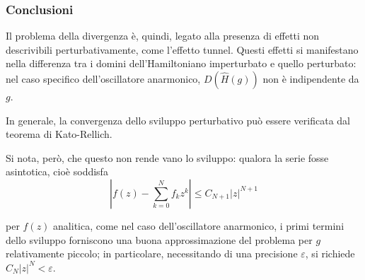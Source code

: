 \documentclass[10pt]{beamer}
\begin{document}
   \begin{frame}
	   \frametitle{Conclusioni}
	   Il problema della divergenza \`e, quindi, legato alla presenza di effetti non descrivibili perturbativamente, come l'effetto tunnel.
	   Questi effetti si manifestano nella differenza tra i domini dell'Hamiltoniano imperturbato e quello perturbato: nel caso specifico dell'oscillatore anarmonico, $D(\hat{H}(g))$ non \`e indipendente da $g$. 
	   
	   In generale, la convergenza dello sviluppo perturbativo pu\`o essere verificata dal teorema di Kato-Rellich.

	   \vspace{.25cm}
	   Si nota, per\`o, che questo non rende vano lo sviluppo: qualora la serie fosse asintotica, cio\`e soddisfa
\[
\left\lvert f(z) - \sum_{k=0}^{N} f_k z^k \right\rvert \le  C_{N+1} \lvert z \rvert ^{N+1} 
\] 

	   per $f(z)$ analitica, come nel caso dell'oscillatore anarmonico, i primi termini dello sviluppo forniscono una buona approssimazione del problema per $g$ relativamente piccolo; in particolare, necessitando di una precisione $\varepsilon $, si richiede $C_N \lvert z \rvert ^N < \varepsilon $.
   \end{frame}
\end{document}

